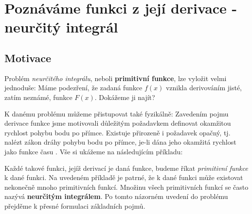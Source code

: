 \setchaptertoc
\chapter{Poznáváme funkci z její derivace - neurčitý integrál}\label{mai:IchapVII}
  \section{Motivace}
    Problém \emph{neurčitého integrálu}, neboli \textbf{primitivní funkce}, lze vyložit velmi 
    jednoduše: Máme podezření, že zadaná funkce \(f(x)\) vznikla derivováním jisté, zatím neznámé, 
    funkce \(F(x)\). Dokážeme ji najít? 
  
    K danému problému můžeme přistupovat také fyzikálně: Zavedením pojmu derivace funkce jsme 
    motivovali důležitým požadavkem definovat okamžitou rychlost pohybu bodu po přímce. Existuje 
    přirozeně i požadavek opačný, tj. nalézt zákon dráhy pohybu bodu po přímce, je-li dána jeho 
    okamžitá rychlost jako funkce času \cite[s.~253]{Brabec1989}. Vše si ukážeme na následujícím 
    příkladu:      
    
    Každé takové funkci, jejíž derivací je daná funkce, budeme říkat \emph{primitivní funkce} k 
    dané funkci. Na uvedeném příkladě je patrné, že k dané funkci může existovat nekonečně mnoho 
    primitivních funkcí. Množinu všech primitivních funkcí se často nazývá \textbf{neurčitým 
    integrálem}. Po tomto názorném uvedení do problému přejděme k přesné formulaci základních pojmů.
    
